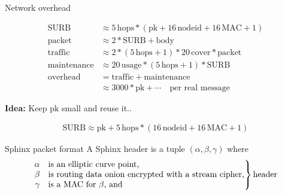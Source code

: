 \documentclass[fleqn,xcolor={usenames,dvipsnames},notes,aspectratio=169]{beamer} %
\begin{document}
\begin{frame}{Network overhead}

\begin{align*}
\mathrm{SURB} &\approx 5\,\mathrm{hops} * (\mathrm{pk} + 16\,\mathrm{nodeid} + 16\,\mathrm{MAC} + 1) \\
\mathrm{packet} &\approx 2 * \mathrm{SURB} + \mathrm{body} \\
\mathrm{traffic} &\approx 2 * (5\,\mathrm{hops} + 1) * 20\,\mathrm{cover} * \mathrm{packet} \\
\mathrm{maintenance} &\approx 20\,\mathrm{usage} * (5\,\mathrm{hops} + 1) *  \mathrm{SURB} \\
\mathrm{overhead} &= \mathrm{traffic} + \mathrm{maintenance} \\
 &\approx 3000 * \mathrm{pk} + \cdots \quad\textrm{per real message}
\end{align*}

\bigskip\pause

{\bf Idea:}  Keep $\mathrm{pk}$ small and reuse it..

\begin{align*}
\mathrm{SURB} \approx \mathrm{pk} + 5\,\mathrm{hops} * (16\, \mathrm{nodeid} + 16\,\mathrm{MAC} + 1) 
\end{align*}

\end{frame}


\begin{frame}{Sphinx packet format}
A Sphinx header is a tuple $(\alpha,\beta,\gamma)$ where \\

 \vspace*{-18pt} \[
\left. \begin{array}{@{}rl@{}}
  \alpha & \text{is an elliptic curve point,}\\
  \beta & \text{is routing data onion encrypted with a stream cipher,}\\
  \gamma & \text{is a MAC for $\beta$, and} \\
\end{array} \right\} \text{header}
\]  %

\def\svgwidth{\columnwidth}


\end{frame}
\end{document}
